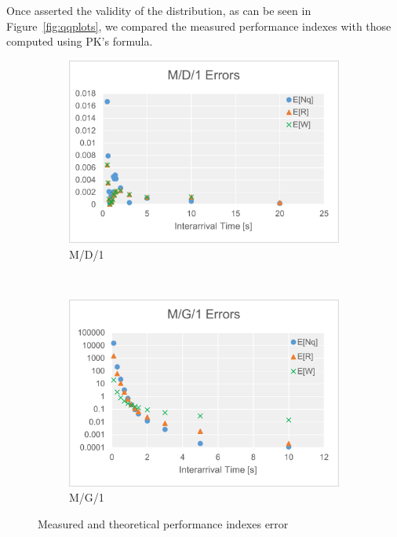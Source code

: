 \documentclass[a4paper,12pt]{article}
\begin{document}
Once asserted the validity of the distribution, as can be seen in Figure~\ref{fig:qqplots}, we compared the measured performance indexes with those computed using PK's formula.

\begin{figure}[H]
  \centering
  \begin{subfigure}[b]{0.40\textwidth}
    \includegraphics[width=\textwidth]{img/MD1.pdf}
    \caption{M/D/1}
  \end{subfigure}
  ~
  \begin{subfigure}[b]{0.40\textwidth}
    \includegraphics[width=\textwidth]{img/MG1.pdf}
    \caption{M/G/1}
  \end{subfigure}
  \caption{Measured and theoretical performance indexes error}
  \label{fig:perf-index-error}
\end{figure}
\end{document}

